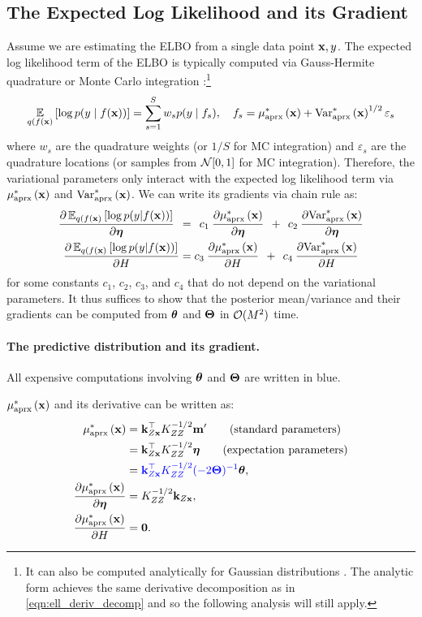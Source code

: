 \subsection{The Expected Log Likelihood and its Gradient}
Assume we are estimating the ELBO from a single data point $\mathbf{x}, y$.
The expected log likelihood term of the ELBO is typically computed via Gauss-Hermite quadrature or Monte Carlo integration \cite{hensman2015scalable}:\footnote{
  It can also be computed analytically for Gaussian distributions \cite{hensman2013gaussian}.
  The analytic form achieves the same derivative decomposition as in \cref{eqn:ell_deriv_decomp}
  and so the following analysis will still apply.
}
%
\[
  \operatorname*{\mathbb{E}}_{q(f(\mathbf{x})} \left[  \log p(y \mid f(\mathbf{x}))  \right] = \sum_{s=1}^S w_s p(y \mid f_s),
  \quad
  f_s = \mu^*_\text{aprx} \left( \mathbf{x} \right) + \text{Var}^*_\text{aprx} \left( \mathbf{x} \right)^{1/2} \varepsilon_s
\]
%
where $w_s$ are the quadrature weights (or $1/S$ for MC integration) and $\varepsilon_s$ are the quadrature locations (or samples from $\normaldist{0}{1}$ for MC integration).
Therefore, the variational parameters only interact with the expected log likelihood term via $\mu^*_\text{aprx} \left( \mathbf{x} \right)$ and $\text{Var}^*_\text{aprx} \left( \mathbf{x} \right)$.
We can write its gradients via chain rule as:
%
\begin{align}
  \frac{ \partial \operatorname*{\mathbb{E}}_{q(f(\mathbf{x})} \left[  \log p(y | f(\mathbf{x}))  \right]}{\partial \boldsymbol{\eta}}
  \:\: &= \:\:
  c_1 \: \frac{ \partial \mu^*_\text{aprx} \left( \mathbf{x} \right)}{\partial \boldsymbol{\eta}}
  \:\: + \:\:
  c_2 \:  \frac{ \partial \text{Var}^*_\text{aprx} \left( \mathbf{x} \right)}{\partial \boldsymbol{\eta}}
  \nonumber \\
  \frac{ \partial \operatorname*{\mathbb{E}}_{q(f(\mathbf{x})} \left[  \log p(y | f(\mathbf{x}))  \right]}{\partial H}
  &=
  c_3 \: \frac{ \partial \mu^*_\text{aprx} \left( \mathbf{x} \right)}{\partial H}
  \:\: + \:\:
  c_4 \:  \frac{ \partial \text{Var}^*_\text{aprx} \left( \mathbf{x} \right)}{\partial H}
  \label{eqn:ell_deriv_decomp}
\end{align}
%
for some constants $c_1$, $c_2$, $c_3$, and $c_4$ that do not depend on the variational parameters.
It thus suffices to show that the posterior mean/variance and their gradients can be computed from $\boldsymbol{\theta}$ and $\boldsymbol{\Theta}$ in $\bigo{M^2}$ time.

\paragraph{The predictive distribution and its gradient.}
All expensive computations involving $\boldsymbol{\theta}$ and $\boldsymbol{\Theta}$ are written in {\color{blue} blue}.

$\mu^*_\text{aprx} \left( \mathbf{x} \right)$ and its derivative can be written as:
%
\begin{align}
  \mu^*_\text{aprx} \left( \mathbf{x} \right)
  &= \mathbf{k}_{Z \mathbf{x}}^\top K_{ZZ}^{-1/2} \mathbf{m}'
  \tag{standard parameters} \\
  &= \mathbf{k}_{Z \mathbf{x}}^\top K_{ZZ}^{-1/2} \boldsymbol{\eta}
  \tag{expectation parameters} \\
  &= {\color{blue} \mathbf{k}_{Z \mathbf{x}}^\top K_{ZZ}^{-1/2} (-2 \boldsymbol{\Theta})^{-1}} \boldsymbol{\theta}
  \label{eqn:pred_mean_natural},
  \\
  \frac{\partial \mu^*_\text{aprx} \left( \mathbf{x} \right)}{\partial \boldsymbol{\eta}}
  &= K_{ZZ}^{-1/2} \mathbf{k}_{Z \mathbf{x}}
  \label{eqn:pred_mean_deriv},
  \\
  \frac{\partial \mu^*_\text{aprx} \left( \mathbf{x} \right)}{\partial H}
  &= \mathbf{0}.
  \nonumber
\end{align}

